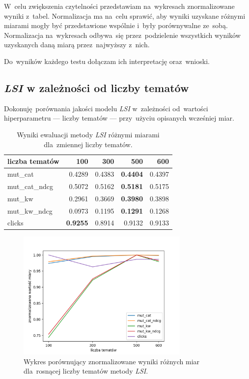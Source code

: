 \documentclass[pl]{minipw} %
\begin{document}
W~celu zwiększenia czytelności przedstawiam na~wykresach znormalizowane wyniki z~tabel. Normalizacja ma na~celu sprawić, aby wyniki uzyskane różnymi miarami mogły być przedstawione wspólnie i~były porównywalne ze~sobą. Normalizacja na~wykresach odbywa~się przez~podzielenie wszystkich wyników uzyskanych daną miarą przez~najwyższy z~nich.

Do~wyników każdego testu dołączam ich interpretację oraz~wnioski.

\subsection{\textit{LSI} w zależności od liczby tematów}

Dokonuję porównania jakości modelu \textit{LSI} w~zależności od~wartości hiperparametru --- liczby tematów --- przy~użyciu opisanych wcześniej miar.

\begin{table}[H]
	\centering
	\begin{tabular}{lrrrr}
		\hline
		liczba tematów &       100 &      300 &      500 &      600 \\
		\hline
		mut\_cat      & 0.4289 & 0.4383 & \textbf{0.4404} & 0.4397 \\
		mut\_cat\_ndcg & 0.5072 & 0.5162 & \textbf{0.5181} & 0.5175 \\
		mut\_kw       & 0.2961 & 0.3669 & \textbf{0.3980}  & 0.3898 \\
		mut\_kw\_ndcg  & 0.0973 & 0.1195 &\textbf{ 0.1291} & 0.1268 \\
		clicks       & \textbf{0.9255} & 0.8914 & 0.9132 & 0.9133 \\
		\hline
	\end{tabular}
	\caption{Wyniki ewaluacji metody \textit{LSI} różnymi miarami dla~zmiennej liczby tematów.}
\end{table}

\begin{figure}[H]
	\centering
	\includegraphics[width=0.75\textwidth]{img/results/lsi_.png}
	\caption{Wykres porównujący znormalizowane wyniki różnych miar dla~rosnącej liczby tematów metody \textit{LSI}.}
\end{figure}
\end{document}
